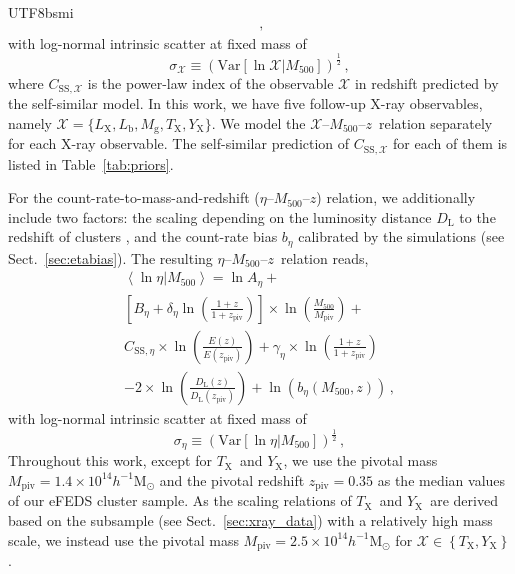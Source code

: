 \documentclass[longauth]{aa}
\newcommand{\Msunh}{\ensuremath{h^{-1}\mathrm{M}_{\odot}}}
\newcommand{\Mfiveoo}{\ensuremath{M_{500}}}
\newcommand{\redshift}{\ensuremath{z}}
\newcommand{\MPIV}{\ensuremath{M_{\mathrm{piv}}}}
\newcommand{\ZPIV}{\ensuremath{z_{\mathrm{piv}}}}
\newcommand{\Ez}{\ensuremath{E(z)}}
\newcommand{\Ezpiv}{\ensuremath{E(z_{\mathrm{piv}})}}
\newcommand{\Xlabel}{\ensuremath{\mathcal{X}}}
\newcommand{\Lx}{\ensuremath{L_{\mathrm{X}}}}
\newcommand{\Lb}{\ensuremath{L_{\mathrm{b}}}}
\newcommand{\Tx}{\ensuremath{T_{\mathrm{X}}}}
\newcommand{\Yx}{\ensuremath{Y_{\mathrm{X}}}}
\newcommand{\Mg}{\ensuremath{M_{\mathrm{g}}}}
\newcommand{\rate}{\ensuremath{\eta}}
\newcommand{\brate}{\ensuremath{b_{\eta}}}
\newcommand{\Aeta}{\ensuremath{A_{\eta}}}
\newcommand{\Beta}{\ensuremath{B_{\eta}}}
\newcommand{\deltaeta}{\ensuremath{\delta_{\eta}}}
\newcommand{\gammaeta}{\ensuremath{\gamma_{\eta}}}
\newcommand{\sigmaeta}{\ensuremath{\sigma_{\eta}}}
\begin{document}
\begin{CJK*}{UTF8}{bsmi}
\begin{multline}
\, ,
\end{multline}
%
with log-normal intrinsic scatter at fixed mass of 
%
\begin{equation}
\label{eq:intrinsic_scatter_x}
\sigma_{\mathcal{X}} \equiv \left(\mathrm{Var}\left[\ln\mathcal{X}|\Mfiveoo \right] \right)^{\frac{1}{2}} \, ,
\end{equation}
%
where $C_{\mathrm{SS},\mathcal{X}}$ is the power-law index of the observable $\mathcal{X}$ in redshift predicted by the self-similar model.
In this work, we have five follow-up X-ray observables, namely $\mathcal{X} = \{\Lx, \Lb, \Mg, \Tx,\Yx\}$.
We model the \Xlabel--\Mfiveoo--\redshift\ relation separately for each X-ray observable.
The self-similar prediction of $C_{\mathrm{SS},\mathcal{X}}$ for each of them is listed in Table~\ref{tab:priors}.

For the count-rate-to-mass-and-redshift (\rate--\Mfiveoo--\redshift) relation, we additionally include two factors: 
 the scaling depending on the luminosity distance $D_{\mathrm{L}}$ to the redshift of clusters \citep{grandis19}, and  the count-rate bias $\brate$ calibrated by the simulations (see Sect.~\ref{sec:etabias}).
The resulting \rate--\Mfiveoo--\redshift\ relation reads,
%
\begin{multline}
\label{eq:countrate_to_mass}
\left\langle\ln\rate|\Mfiveoo\right\rangle 
= \ln \Aeta + \\
\left[ \Beta + \deltaeta\ln\left(\frac{1 + \redshift}{1 + \ZPIV}\right) \right] \times
\ln\left(\frac{\Mfiveoo}{\MPIV}\right) +
\\
C_{\mathrm{SS},\rate} \times \ln\left(\frac{\Ez}{\Ezpiv}\right) + 
\gammaeta \times 
\ln \left(\frac{1 + \redshift}{1 + \ZPIV}\right)
\\
-2\times\ln\left(\frac{D_{\mathrm{L}}\left(\redshift\right)}{D_{\mathrm{L}}\left(\ZPIV\right)}\right)
+ \ln\left( \brate\left(\Mfiveoo, \redshift\right) \right) 
\, ,
\end{multline}
%
with log-normal intrinsic scatter at fixed mass of 
%
\begin{equation}
\label{eq:intrinsic_scatter_rate}
\sigmaeta \equiv \left(\mathrm{Var}\left[\ln \rate|\Mfiveoo\right]\right)^{\frac{1}{2}} \, ,
\end{equation}
%
Throughout this work, except for \Tx\ and \Yx, we use the pivotal mass $\MPIV=1.4\times10^{14}\Msunh$ and the pivotal redshift $\ZPIV=0.35$ as the median values of our eFEDS cluster sample.
As the scaling relations of \Tx\ and \Yx\ are derived based on the subsample (see Sect.~\ref{sec:xray_data}) with a relatively high mass scale, we instead use the pivotal mass $\MPIV=2.5\times10^{14}\Msunh$ for $\Xlabel \in \left\lbrace\Tx, \Yx\right\rbrace$.




\end{CJK*}
\end{document}
